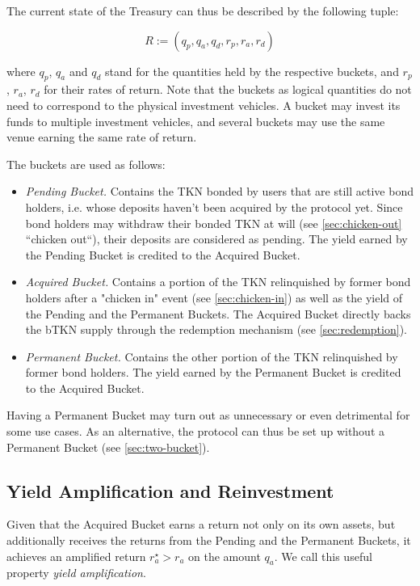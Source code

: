 \documentclass{article}
\begin{document}
The current state of the Treasury can thus be described by the following tuple:

\begin{equation}
  \label{eq:treasury}
    R:=(q_p, q_a, q_d, r_p, r_a, r_d)
\end{equation}

where $q_p$, $q_a$ and $q_d$ stand for the quantities held by the respective buckets, and $r_p$, $r_a$, $r_d$ for their rates of return. Note that the buckets as logical quantities do not need to correspond to the physical investment vehicles. A bucket may invest its funds to multiple investment vehicles, and several buckets may use the same venue earning the same rate of return.

The buckets are used as follows:
\begin{itemize}
    \item \textit{Pending Bucket.} Contains the TKN bonded by users that are still active bond holders, i.e. whose deposits haven’t been acquired by the protocol yet. Since bond holders may withdraw their bonded TKN at will (see \ref{sec:chicken-out} “chicken out“), their deposits are considered as pending. The yield earned by the Pending Bucket is credited to the Acquired Bucket.
    \item \textit{Acquired Bucket.} Contains a portion of the TKN relinquished by former bond holders after a "chicken in" event (see \ref{sec:chicken-in}) as well as the yield of the Pending and the Permanent Buckets. The Acquired Bucket directly backs the bTKN supply through the redemption mechanism (see \ref{sec:redemption}).
    \item \textit{Permanent Bucket.} Contains the other portion of the TKN relinquished by former bond holders. The yield earned by the Permanent Bucket is credited to the Acquired Bucket.
\end{itemize}

Having a Permanent Bucket may turn out as unnecessary or even detrimental for some use cases. As an alternative, the protocol can thus be set up without a Permanent Bucket (see \ref{sec:two-bucket}).

\subsection{Yield Amplification and Reinvestment}
Given that the Acquired Bucket earns a return not only on its own assets, but additionally receives the returns from the Pending and the Permanent Buckets, it achieves an amplified return $r_a^\star > r_a$ on the amount $q_a$. We call this useful property \textit{yield amplification}.
\end{document}

